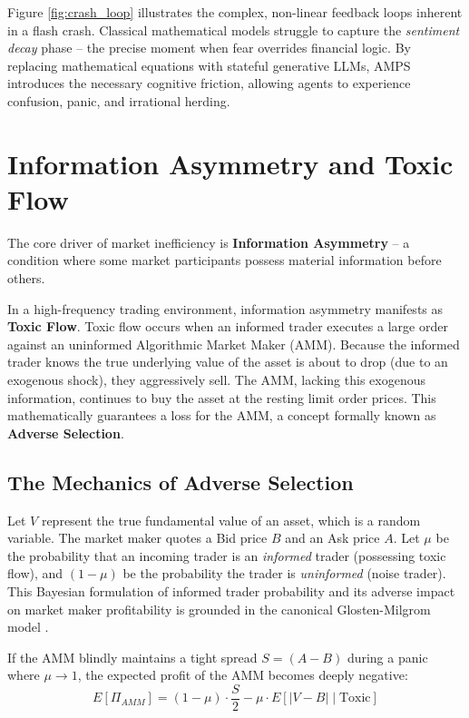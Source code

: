 Figure \ref{fig:crash_loop} illustrates the complex, non-linear feedback loops inherent in a flash crash. Classical mathematical models struggle to capture the \textit{sentiment decay} phase -- the precise moment when fear overrides financial logic. By replacing mathematical equations with stateful generative LLMs, AMPS introduces the necessary cognitive friction, allowing agents to experience confusion, panic, and irrational herding.

\section{Information Asymmetry and Toxic Flow}

The core driver of market inefficiency is \textbf{Information Asymmetry} -- a condition where some market participants possess material information before others. 

In a high-frequency trading environment, information asymmetry manifests as \textbf{Toxic Flow}. Toxic flow occurs when an informed trader executes a large order against an uninformed Algorithmic Market Maker (AMM). Because the informed trader knows the true underlying value of the asset is about to drop (due to an exogenous shock), they aggressively sell. The AMM, lacking this exogenous information, continues to buy the asset at the resting limit order prices. This mathematically guarantees a loss for the AMM, a concept formally known as \textbf{Adverse Selection}.

\subsection{The Mechanics of Adverse Selection}

Let $V$ represent the true fundamental value of an asset, which is a random variable. The market maker quotes a Bid price $B$ and an Ask price $A$. Let $\mu$ be the probability that an incoming trader is an \textit{informed} trader (possessing toxic flow), and $(1-\mu)$ be the probability the trader is \textit{uninformed} (noise trader). This Bayesian formulation of informed trader probability and its adverse impact on market maker profitability is grounded in the canonical Glosten-Milgrom model \cite{glosten1985bid}.

If the AMM blindly maintains a tight spread $S = (A - B)$ during a panic where $\mu \to 1$, the expected profit of the AMM becomes deeply negative:
\begin{equation}
    E[\Pi_{AMM}] = (1 - \mu) \cdot \frac{S}{2} - \mu \cdot E[|V - B| \mid \text{Toxic}]
\end{equation}

